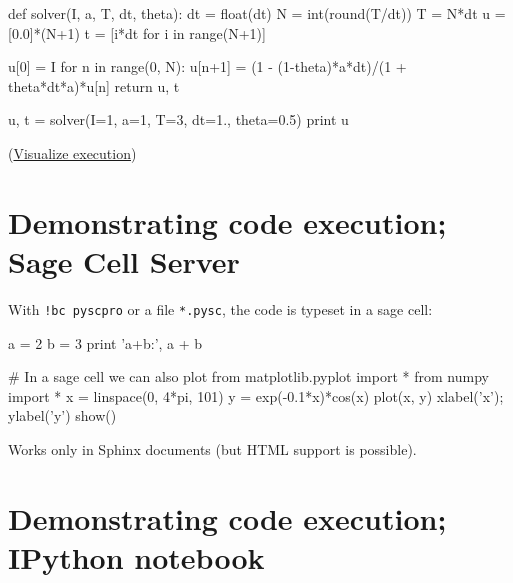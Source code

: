 \documentclass[%
twoside,                 %
final,                   %
chapterprefix=true,      %
open=right               %
10pt]{book}
\newenvironment{graybox1admon}[1][]{
\begin{graybox1mdframed}[frametitle=#1]
}
{
\end{graybox1mdframed}
}
\begin{document}
\begin{python:nt}
def solver(I, a, T, dt, theta):
    dt = float(dt)
    N = int(round(T/dt))
    T = N*dt
    u = [0.0]*(N+1)
    t = [i*dt for i in range(N+1)]

    u[0] = I
    for n in range(0, N):
        u[n+1] = (1 - (1-theta)*a*dt)/(1 + theta*dt*a)*u[n]
    return u, t

u, t = solver(I=1, a=1, T=3, dt=1., theta=0.5)
print u
\end{python:nt}
\noindent
(\href{{http://pythontutor.com/visualize.html\#code=def+solver\%28I\%2C+a\%2C+T\%2C+dt\%2C+theta\%29\%3A\%0A++++dt+\%3D+float\%28dt\%29\%0A++++N+\%3D+int\%28round\%28T\%2Fdt\%29\%29\%0A++++T+\%3D+N\%2Adt\%0A++++u+\%3D+\%5B0.0\%5D\%2A\%28N\%2B1\%29\%0A++++t+\%3D+\%5Bi\%2Adt+for+i+in+range\%28N\%2B1\%29\%5D\%0A\%0A++++u\%5B0\%5D+\%3D+I\%0A++++for+n+in+range\%280\%2C+N\%29\%3A\%0A++++++++u\%5Bn\%2B1\%5D+\%3D+\%281+-+\%281-theta\%29\%2Aa\%2Adt\%29\%2F\%281+\%2B+theta\%2Adt\%2Aa\%29\%2Au\%5Bn\%5D\%0A++++return+u\%2C+t\%0A\%0Au\%2C+t+\%3D+solver\%28I\%3D1\%2C+a\%3D1\%2C+T\%3D3\%2C+dt\%3D1.\%2C+theta\%3D0.5\%29\%0Aprint+u&mode=display&cumulative=false&heapPrimitives=false&drawParentPointers=false&textReferences=false&py=2&curInstr=0}}{Visualize execution}) 


\section*{Demonstrating code execution; Sage Cell Server}
\label{slide:sage:cell}

With \Verb~!bc pyscpro~ or a file \Verb!*.pysc!, the code is typeset in
a sage cell:

\begin{python:nt}
a = 2
b = 3
print 'a+b:', a + b

# In a sage cell we can also plot
from matplotlib.pyplot import *
from numpy import *
x = linspace(0, 4*pi, 101)
y = exp(-0.1*x)*cos(x)
plot(x, y)
xlabel('x'); ylabel('y')
show()
\end{python:nt}


\begin{graybox1admon}[Warning.]
Works only in Sphinx documents (but HTML support is possible).
\end{graybox1admon}



\section*{Demonstrating code execution; IPython notebook}
\label{slide:ipynb}
\end{document}
